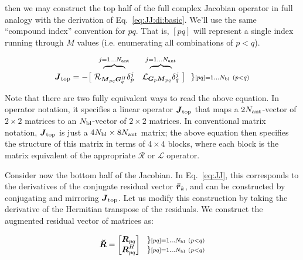 \documentclass[useAMS,usenatbib]{mn2e}
\newcommand{\rrc}{\bmath{\bar r}}
\newcommand{\mat}[1]{{\bmath{#1}}}
\newcommand{\JJ}{\mat{J}} %
\newcommand{\MM}{\mat{M}}
\newcommand{\RR}{\mat{R}}
\newcommand{\GG}{\mat{G}}
\begin{document}
then we may construct the top half of the full complex Jacobian operator in full analogy with the 
derivation of Eq.~\ref{eq:JJ:di:basic}. We'll use the same ``compound index'' convention for $pq$. That is, 
$[pq]$ will represent a single index running through $M$ values (i.e. enumerating all combinations of $p<q$).

\begin{equation}
\label{eq:JJtop}
\begin{array}{r@{~}cc@{~}cc}
  & \overbrace{~~~~~~~~}^{j=1\dots \Na} & \overbrace{~~~~~~~~}^{j=1\dots \Na} \\

\JJ_\mathrm{top} = - \big [ & 
\Rop{ \MM_{pq}\GG^H_q }\delta^j_p & 
\Lop{ \GG_p \MM_{pq}  }\delta^j_q 
& \big ] ~~ \} \scriptstyle [pq]=1\dots \Nbl~(p<q)
% 
\end{array}
\end{equation}

Note that there are two fully equivalent ways to read the above equation. In operator notation, it specifies a linear operator $\JJ_\mathrm{top}$
that maps a $2N_\mathrm{ant}$-vector of $2\times2$ matrices to an $N_\mathrm{bl}$-vector of $2\times2$ matrices. In conventional matrix notation, 
$\JJ_\mathrm{top}$ is just a $4N_\mathrm{bl}\times8N_\mathrm{ant}$ matrix; the above equation then specifies the structure of this matrix in terms
of $4\times4$ blocks, where each block is the matrix equivalent of the appropriate $\mathcal{R}$ or $\mathcal{L}$ operator.

Consider now the bottom half of the Jacobian. In Eq.~\ref{eq:JJ}, this corresponds to the derivatives of the conjugate residual
vector $\rrc_k$, and can be constructed by conjugating and mirroring $\JJ_\mathrm{top}$. Let us modify this construction 
by taking the derivative of the Hermitian transpose of the residuals. We construct the augmented residual vector of matrices
as:

\begin{equation}
\RRr = 
\Matrix{c}{
  \RR_{pq} \\ 
  \RR^H_{pq} 
} 
~~ 
\Stack{ 
\} \scriptstyle [pq]=1\dots \Nbl~(p<q) \\ 
\} \scriptstyle [pq]=1\dots \Nbl~(p<q) 
}
\label{eq:RRtranspose}
\end{equation}

\end{document}
